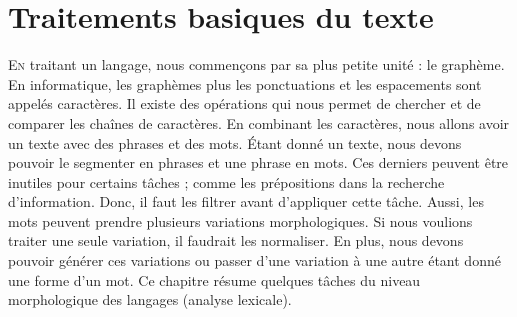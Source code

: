\documentclass{KodeBook}
\begin{document}
		\mainmatter
	
\fi
\chapter{Traitements basiques du texte}

\begin{introduction}
	\lettrine{E}{n} traitant un langage, nous commençons par sa plus petite unité : le graphème. 
	En informatique, les graphèmes plus les ponctuations et les espacements sont appelés caractères. 
	Il existe des opérations qui nous permet de chercher et de comparer les chaînes de caractères.
	En combinant les caractères, nous allons avoir un texte avec des phrases et des mots. 
	Étant donné un texte, nous devons pouvoir le segmenter en phrases et une phrase en mots. 
	Ces derniers peuvent être inutiles pour certains tâches ; comme les prépositions dans la recherche d'information. 
	Donc, il faut les filtrer avant d'appliquer cette tâche. 
	Aussi, les mots peuvent prendre plusieurs variations morphologiques. 
	Si nous voulions traiter une seule variation, il faudrait les normaliser. 
	En plus, nous devons pouvoir générer ces variations ou passer d'une variation à une autre étant donné une forme d'un mot. 
	Ce chapitre résume quelques tâches du niveau morphologique des langages (analyse lexicale).
\end{introduction} 
\end{document}
